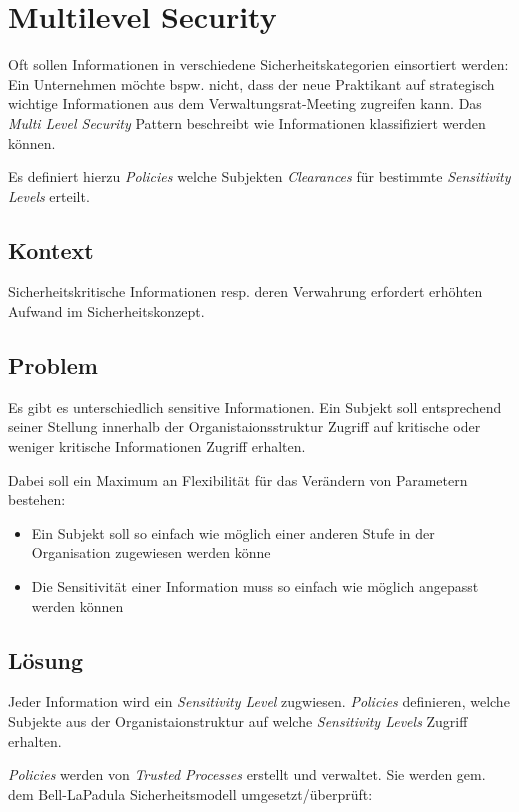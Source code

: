 \section{Multilevel Security}

Oft sollen Informationen in verschiedene Sicherheitskategorien einsortiert werden: Ein Unternehmen möchte bspw. nicht, dass der neue Praktikant auf strategisch wichtige Informationen aus dem Verwaltungsrat-Meeting zugreifen kann. Das \emph{Multi Level Security} Pattern beschreibt wie Informationen klassifiziert werden können.

Es definiert hierzu \emph{Policies} welche Subjekten \emph{Clearances} für bestimmte \emph{Sensitivity Levels} erteilt.


\subsection*{Kontext}
Sicherheitskritische Informationen resp. deren Verwahrung erfordert erhöhten Aufwand im Sicherheitskonzept.

\subsection*{Problem}
Es gibt es unterschiedlich sensitive Informationen. Ein Subjekt soll entsprechend seiner Stellung innerhalb der Organistaionsstruktur Zugriff auf kritische oder weniger kritische Informationen Zugriff erhalten.

Dabei soll ein Maximum an Flexibilität für das Verändern von Parametern bestehen:
\begin{itemize}
	\item Ein Subjekt soll so einfach wie möglich einer anderen Stufe in der Organisation zugewiesen werden könne
	\item Die Sensitivität einer Information muss so einfach wie möglich angepasst werden können
\end{itemize}

\subsection*{Lösung}
Jeder Information wird ein \emph{Sensitivity Level} zugwiesen. \emph{Policies} definieren, welche Subjekte aus der Organistaionstruktur auf welche \emph{Sensitivity Levels} Zugriff erhalten.

\emph{Policies} werden von \emph{Trusted Processes} erstellt und verwaltet. Sie werden gem. dem Bell-LaPadula Sicherheitsmodell\cite{BellLaPadula} umgesetzt/überprüft:

